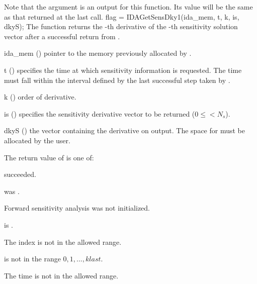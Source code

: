 {
  Note that the argument  is an output for this function. Its value will be
  the same as that returned at the last  call.
}
{
  flag = IDAGetSensDky1(ida\_mem, t, k, is, dkyS);
}
{
  The function  returns the -th derivative of the 
  -th sensitivity solution vector after a successful return from .
}
{
  \begin{args}
  \item[ida\_mem] ()
    pointer to the memory previously allocated by .
  \item[t] ()
    specifies the time at which sensitivity information is 
    requested. The time  must fall within the interval defined by the last 
    successful step taken by {\idas}.
  \item[k] () order of derivative.
  \item[is] () specifies the sensitivity derivative vector to be returned
    ($0\le$$< N_s$).
  \item[dkyS] ()
    the vector containing the derivative on output. The space for  must be
    allocated by the user. 
  \end{args}
}
{
  The return value  of  is one of:
  \begin{args}
  \item[\Id{IDA\_SUCCESS}] 
     succeeded.
  \item[\Id{IDA\_MEM\_NULL}] 
     was .
  \item[\Id{IDA\_NO\_SENS}] 
    Forward sensitivity analysis was not initialized.
  \item[\Id{IDA\_BAD\_DKY}] 
     is .
  \item[\Id{IDA\_BAD\_IS}]
    The index  is not in the allowed range.
  \item[\Id{IDA\_BAD\_K}] 
     is not in the range $0, 1, ..., klast$.
  \item[\Id{IDA\_BAD\_T}] 
    The time  is not in the allowed range.
  \end{args}
}
{}

